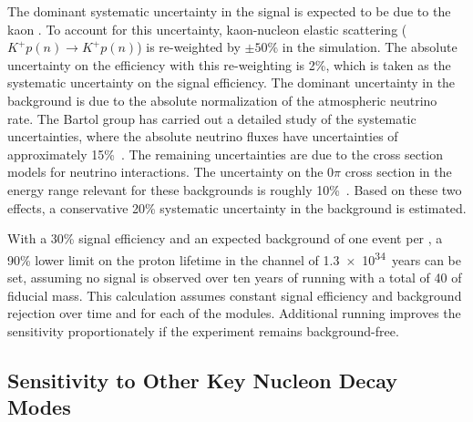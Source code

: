 The dominant systematic uncertainty in the signal is expected to be due to the kaon . To account for this uncertainty, kaon-nucleon elastic scattering ($K^{+}p(n)\rightarrow K^{+}p(n)$) is re-weighted by $\pm \num{50}\%$ in the simulation. 
The absolute uncertainty on the efficiency with this re-weighting is \num{2}\%, which is taken as the systematic uncertainty on the signal efficiency.
The dominant uncertainty in the background 
is due to the absolute normalization of the atmospheric neutrino rate. The Bartol group has carried out a detailed study of the systematic uncertainties, where the absolute neutrino fluxes have uncertainties of approximately \num{15}\%~\cite{Barr:2006it}.
The remaining uncertainties are due to the cross section models for neutrino interactions.
The uncertainty on the 0$\pi$ cross section in the energy range relevant for these backgrounds is roughly \num{10}\%~\cite{Mahn:2018mai}.
Based on these two effects, a conservative \num{20}\% systematic uncertainty in the background is estimated.

With a \num{30}\% signal efficiency and an expected background of one event per \si{\Mtyr}, a \num{90}\%  lower limit on the proton lifetime in the \ptoknubar channel of \SI{1.3e34}{years} can be set, assuming no signal is observed over ten years of running with a total of \SI{40}{\kt} of fiducial mass. This calculation assumes constant signal efficiency and background rejection over time and for each of the  modules.  Additional running improves the sensitivity proportionately if the experiment remains background-free.

\subsection{Sensitivity to Other Key Nucleon Decay Modes}
\label{subsec:nonaccel-ndk-other}

